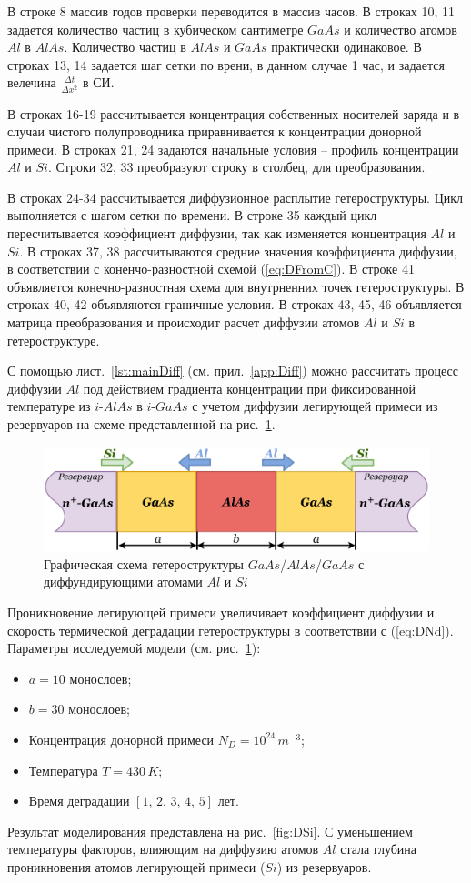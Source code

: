 В строке 8 массив годов проверки переводится в массив часов. В строках 10, 11 задается количество частиц в кубическом сантиметре $GaAs$ и количество атомов $Al$ в $AlAs$. Количество частиц в $AlAs$ и $GaAs$ практически одинаковое. В строках 13, 14 задается шаг сетки по врени, в данном случае 1 час, и задается велечина $\frac{\Delta t}{\Delta x^{2}}$ в СИ.

В строках 16-19 рассчитывается концентрация собственных носителей заряда и в случаи чистого полупроводника приравнивается к концентрации донорной примеси. В строках 21, 24 задаются начальные условия -- профиль концентрации $Al$ и $Si$. Строки 32, 33 преобразуют строку в столбец, для преобразования. 

В строках 24-34 рассчитывается диффузионное расплытие гетероструктуры. Цикл выполняется с шагом сетки по времени. В строке 35 каждый цикл пересчитывается коэффициент диффузии, так как изменяется концентрация $Al$ и $Si$. В строках 37, 38 рассчитываются средние значения коэффициента диффузии, в соответствии с коненчо-разностной схемой (\ref{eq:DFromC}). В строке 41 объявляется конечно-разностная схема для внутрненних точек гетероструктуры. В строках 40, 42 объявляются граничные условия. В строках 43, 45, 46 объявляется матрица преобразования и происходит расчет диффузии атомов $Al$ и $Si$ в гетероструктуре.

С помощью лист.~\ref{lst:mainDiff} (см. прил.~\ref{app:Diff}) можно рассчитать процесс диффузии $Al$ под действием градиента концентрации при фиксированной температуре из $i$-$AlAs$ в $i$-$GaAs$ с учетом диффузии легирующей примеси из резервуаров на схеме представленной на рис.~\ref{fig:DSiBox}.
\begin{figure}[h!]
	\centering
	\includegraphics[width=0.8\linewidth]{assets/DSiBox}
	\caption{Графическая схема гетероструктуры $GaAs$/$AlAs$/$GaAs$ с диффундирующими атомами $Al$ и $Si$}
	\label{fig:DSiBox}
\end{figure}

Проникновение легирующей примеси увеличивает коэффициент диффузии и скорость термической деградации гетероструктуры в соответствии с (\ref{eq:DNd}). Параметры исследуемой модели (см. рис.~\ref{fig:DSiBox}):
\begin{itemize}
	\item $a = 10$ монослоев;
	\item $b = 30$ монослоев;
	\item Концентрация донорной примеси $N_{D} = 10^{24}\,m^{-3}$;
	\item Температура $T = 430\,K$;
	\item Время деградации $[1,\,2,\,3,\,4,\,5]$ лет.
\end{itemize}
Результат моделирования представлена на рис.~\ref{fig:DSi}. С уменьшением температуры факторов, влияющим на диффузию атомов $Al$ стала глубина проникновения атомов легирующей примеси ($Si$) из резервуаров.

